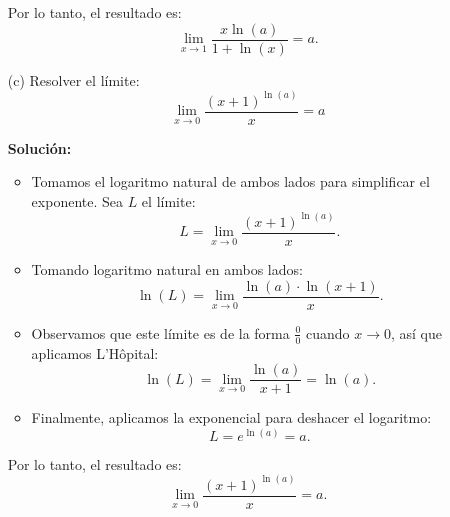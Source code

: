 \begin{enumerate}
    Por lo tanto, el resultado es:
    \[
    \lim_{x \to 1} \frac{x \ln(a)}{1 + \ln(x)} = a.
    \]
    
    \item[(c)] 
    Resolver el límite:
    \[
    \lim_{x \to 0} \frac{(x + 1)^{\ln(a)}}{x} = a
    \]
    
    \textbf{Solución:}
    
    \begin{itemize}
        \item Tomamos el logaritmo natural de ambos lados para simplificar el exponente. Sea \(L\) el límite:
        \[
        L = \lim_{x \to 0} \frac{(x + 1)^{\ln(a)}}{x}.
        \]
        \item Tomando logaritmo natural en ambos lados:
        \[
        \ln(L) = \lim_{x \to 0} \frac{\ln(a) \cdot \ln(x + 1)}{x}.
        \]
        \item Observamos que este límite es de la forma \( \frac{0}{0} \) cuando \( x \to 0 \), así que aplicamos L'Hôpital:
        \[
        \ln(L) = \lim_{x \to 0} \frac{\ln(a)}{x + 1} = \ln(a).
        \]
        \item Finalmente, aplicamos la exponencial para deshacer el logaritmo:
        \[
        L = e^{\ln(a)} = a.
        \]
    \end{itemize}
    
    Por lo tanto, el resultado es:
    \[
    \lim_{x \to 0} \frac{(x + 1)^{\ln(a)}}{x} = a.
    \]
    
\end{enumerate}